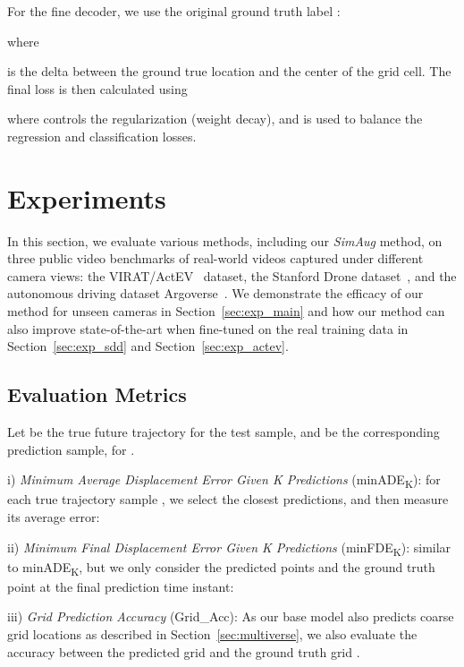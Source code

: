 \documentclass[runningheads]{eccv2020/llncs}
\newcommand{\fancyname}{SimAug}
\begin{document}
For the fine decoder, we use the original ground truth label :

where 
 
is the delta between the ground true location and the center of the  grid cell. 
The final loss is then calculated using

where  controls the  regularization (weight decay),
and  is used
to balance the regression and classification losses.






%
 
\section{Experiments}
\label{sec:exp}

In this section, we evaluate various methods, including our \textit{\fancyname} method, on three public video benchmarks of real-world videos captured under different camera views: the VIRAT/ActEV~\cite{2018trecvidawad,oh2011large} dataset, the Stanford Drone dataset~\cite{robicquet2016learning}, and the autonomous driving dataset Argoverse~\cite{chang2019argoverse}.
We demonstrate the efficacy of our method for unseen cameras in Section~\ref{sec:exp_main} and how our method can also improve state-of-the-art when fine-tuned on the real training data in Section~\ref{sec:exp_sdd} and Section~\ref{sec:exp_actev}.

\subsection{Evaluation Metrics}
\label{sec:metrics}
Let  be the true future trajectory for the  test sample, and  be the corresponding  prediction sample, for .

\noindent i) \textit{Minimum Average Displacement Error Given K Predictions} (minADE\textsubscript{K}): for each true trajectory sample ,
we select the closest  predictions,
and then measure its average error:


\noindent ii) \textit{Minimum Final Displacement Error Given K Predictions} (minFDE\textsubscript{K}): similar to minADE\textsubscript{K}, but we only consider the predicted points and the ground truth point at the final prediction time instant:

\noindent iii) \textit{Grid Prediction Accuracy} (Grid\_Acc):
As our base model also predicts coarse grid locations as described in Section~\ref{sec:multiverse}, we also evaluate the accuracy between the predicted grid  and the ground truth grid .
\end{document}
